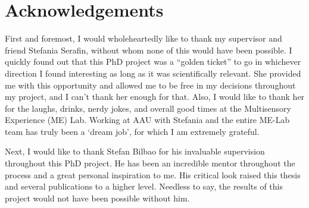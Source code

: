 

\pagebreak
\section*{Acknowledgements}
First and foremost, I would wholeheartedly like to thank my supervisor and friend Stefania Serafin, without whom none of this would have been possible. I quickly found out that this PhD project was a ``golden ticket'' to go in whichever direction I found interesting as long as it was scientifically relevant. She provided me with this opportunity and allowed me to be free in my decisions throughout my project, and I can't thank her enough for that. Also, I would like to thank her for the laughs, drinks, nerdy jokes, and overall good times at the Multisensory Experience (ME) Lab. Working at AAU with Stefania and the entire ME-Lab team has truly been a `dream job', for which I am extremely grateful. 



Next, I would like to thank Stefan Bilbao for his invaluable supervision throughout this PhD project. He has been an incredible mentor throughout the process and a great personal inspiration to me. His critical look raised this thesis and several publications to a higher level. Needless to say, the results of this project would not have been possible without him. 


